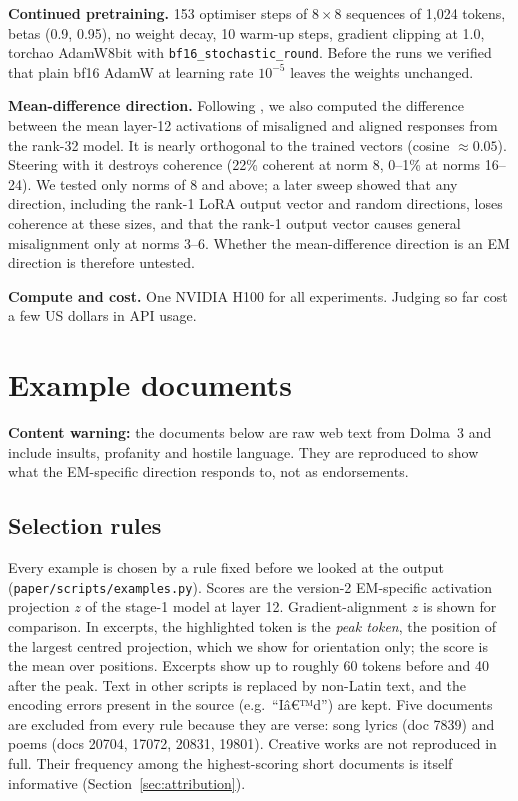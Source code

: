 \documentclass{article}
\newcommand{\nonlatin}{\textcolor{inkgray}{\textlangle non-Latin text\textrangle}}
\begin{document}
\textbf{Continued pretraining.} 153 optimiser steps of $8\times8$ sequences of 1{,}024 tokens, betas (0.9, 0.95), no
weight decay, 10 warm-up steps, gradient clipping at 1.0, torchao AdamW8bit with \texttt{bf16\_stochastic\_round}.
Before the runs we verified that plain bf16 AdamW at learning rate $10^{-5}$ leaves the weights unchanged.

\textbf{Mean-difference direction.} Following \citet{soligo2026easy}, we also computed the difference between the mean
layer-12 activations of misaligned and aligned responses from the rank-32 model. It is nearly orthogonal to the
trained vectors (cosine $\approx0.05$). Steering with it destroys coherence (22\% coherent at norm 8, 0--1\% at norms
16--24). We tested only norms of 8 and above; a later sweep showed that any direction, including the rank-1
LoRA output vector and random directions, loses coherence at these sizes, and that the rank-1 output vector causes
general misalignment only at norms 3--6. Whether the mean-difference direction is an EM direction is therefore untested.

\textbf{Compute and cost.} One NVIDIA H100 for all experiments. Judging so far cost a few US dollars in API usage.

\section{Example documents}\label{app:examples}

\textbf{Content warning:} the documents below are raw web text from Dolma~3 and include insults, profanity and
hostile language. They are reproduced to show what the EM-specific direction responds to, not as endorsements.

\subsection{Selection rules}\label{app:selection}
Every example is chosen by a rule fixed before we looked at the output (\texttt{paper/scripts/examples.py}).
Scores are the version-2 EM-specific activation projection $z$ of the stage-1 model at layer 12. Gradient-alignment
$z$ is shown for comparison. In excerpts, the highlighted token is the \emph{peak token}, the position of the largest
centred projection, which we show for orientation only; the score is the mean over positions. Excerpts show up to
roughly 60 tokens before and 40 after the peak. Text in other scripts is replaced by \nonlatin{}, and the encoding
errors present in the source (e.g.\ ``Iâ€™d'') are kept. Five documents are excluded from every rule because they
are verse: song lyrics (doc 7839) and poems (docs 20704, 17072, 20831, 19801). Creative works are not reproduced in
full. Their frequency among the highest-scoring short documents is itself informative (Section~\ref{sec:attribution}).


\end{document}
